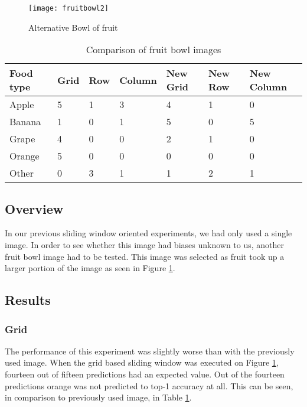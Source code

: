 \begin{figure}
    \texttt{[image: fruitbowl2]}
    \caption{Alternative Bowl of fruit}
    \label{fig:newFruit}
\end{figure}

\begin{table}[]
    \centering
    \caption{Comparison of fruit bowl images}
    \label{newFruitTable}
    \begin{tabular}{|l|l|l|l|l|l|l|}
    \hline
        \textbf{Food type} & \textbf{Grid} & \textbf{Row} & \textbf{Column} & \textbf{New Grid} & \textbf{New Row} & \textbf{New Column} \\ \hline
        Apple     & 5    & 1   & 3      & 4        & 1       & 0          \\ \hline
        Banana    & 1    & 0   & 1      & 5        & 0       & 5          \\ \hline
        Grape     & 4    & 0   & 0      & 2        & 1       & 0          \\ \hline
        Orange    & 5    & 0   & 0      & 0        & 0       & 0          \\ \hline
        Other     & 0    & 3   & 1      & 1        & 2       & 1         \\ \hline
    \end{tabular}
\end{table}

\subsection*{Overview}
In our previous sliding window oriented experiments, we had only used a
single image. In order to see whether this image had biases unknown
to us, another fruit bowl image had to be tested. This image was selected as
fruit took up a larger portion of the image as seen in Figure \ref{fig:newFruit}.

\subsection*{Results}
\subsubsection*{Grid}
The performance of this experiment was slightly worse than with the previously
used image. When the grid based sliding window was executed on Figure
\ref{fig:newFruit}, fourteen out of fifteen predictions had an expected value.
Out of the fourteen predictions orange was not predicted to top-1 accuracy at
all. This can be seen, in comparison to previously used image, in Table
\ref{newFruitTable}.

